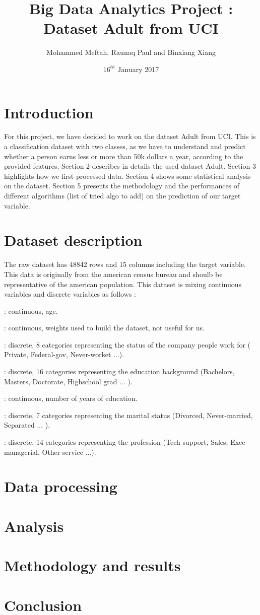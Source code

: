 \documentclass[12pt]{article}
\title{Big Data Analytics Project : Dataset Adult from UCI }
\author{Mohammed Meftah, Raunaq Paul and Binxiang Xiang}
\date{$16^{th}$ January 2017}
\begin{document}
\maketitle
\tableofcontents

\newpage
\section{Introduction}
For this project, we have decided to work on the dataset Adult from UCI. This is a classification dataset with two classes, as we have to understand and predict whether a person earns less or more than 50k dollars a year, according to the provided features. Section 2 describes in details the used dataset Adult. Section 3 highlights how we first processed data. Section 4 shows some statistical analysis on the dataset. Section 5 presents the methodology and the performances of different algorithms (list of tried algo to add) on the prediction of our target variable. 

\section{Dataset description}
The raw dataset has 48842 rows and 15 columns including the target variable. This data is originally from the american census bureau and shoulb be representative of the american population. This dataset is mixing continuous variables and discrete variables as follows : 
\begin{center}
\begin{description}\itemsep0.5pt
\item[age] : continuous, age.
\item[fnlwgt] : continuous, weights used to build the dataset, not useful for us.
\item[workclass] : discrete, 8 categories representing the status of the company people work for ( Private, Federal-gov, Never-worket ...).
\item[education] : discrete, 16 categories representing the education background (Bachelors, Masters, Doctorate, Highschool grad ... ).
\item[education-num] : continuous, number of years of education.
\item[marital-status] : discrete, 7 categories representing the marital status (Divorced, Never-married, Separated ... ).
\item[occupation] : discrete, 14 categories representing the profession (Tech-support, Sales, Exec-managerial, Other-service ...).

\end{description}
\end{center}
\section{Data processing}
\section{Analysis}
\section{Methodology and results}
\section{Conclusion}
\end{document}
